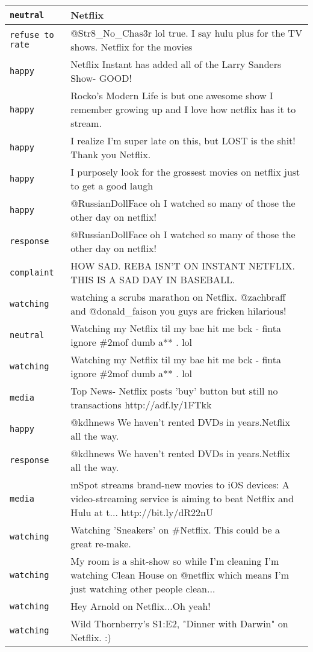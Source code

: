 \begin{center}
\begin{longtable}{|l|p{120mm}|}
      \tabularnewline\hline
         \texttt{neutral} & Netflix
      \tabularnewline\hline
         \texttt{refuse to rate} & @Str8\_No\_Chas3r lol true. I say hulu plus for the TV shows. Netflix for the movies
      \tabularnewline\hline
         \texttt{happy} & Netflix Instant has added all of the Larry Sanders Show- GOOD!
      \tabularnewline\hline
         \texttt{happy} & Rocko's Modern Life is but one awesome show I remember growing up and I love how netflix has it to stream.
      \tabularnewline\hline
         \texttt{happy} & I realize I'm super late on this, but LOST is the shit! Thank you Netflix.
      \tabularnewline\hline
         \texttt{happy} & I purposely look for the grossest movies on netflix just to get a good laugh
      \tabularnewline\hline
         \texttt{happy} & @RussianDollFace oh I watched so many of those the other day on netflix!
      \tabularnewline\hline
         \texttt{response} & @RussianDollFace oh I watched so many of those the other day on netflix!
      \tabularnewline\hline
         \texttt{complaint} & HOW SAD. REBA ISN'T ON INSTANT NETFLIX. THIS IS A SAD DAY IN BASEBALL.
      \tabularnewline\hline
         \texttt{watching} & watching a scrubs marathon on Netflix. @zachbraff and @donald\_faison you guys are fricken hilarious!
      \tabularnewline\hline
         \texttt{neutral} & Watching my Netflix til my bae hit me bck - finta ignore \#2mof dumb a** . lol
      \tabularnewline\hline
         \texttt{watching} & Watching my Netflix til my bae hit me bck - finta ignore \#2mof dumb a** . lol
      \tabularnewline\hline
         \texttt{media} & Top News- Netflix posts 'buy' button but still no transactions http://adf.ly/1FTkk
      \tabularnewline\hline
         \texttt{happy} & @kdhnews We haven't rented DVDs in years.Netflix all the way.
      \tabularnewline\hline
         \texttt{response} & @kdhnews We haven't rented DVDs in years.Netflix all the way.
      \tabularnewline\hline
         \texttt{media} & mSpot streams brand-new movies to iOS devices: A video-streaming service is aiming to beat Netflix and Hulu at t... http://bit.ly/dR22nU
      \tabularnewline\hline
         \texttt{watching} & Watching 'Sneakers' on \#Netflix. This could be a great re-make.
      \tabularnewline\hline
         \texttt{watching} & My room is a shit-show so while I'm cleaning I'm watching Clean House on @netflix which means I'm just watching other people clean...
      \tabularnewline\hline
         \texttt{watching} & Hey Arnold on Netflix...Oh yeah!
      \tabularnewline\hline
         \texttt{watching} & Wild Thornberry's S1:E2, "Dinner with Darwin" on Netflix. :)

\end{longtable}
\end{center}
